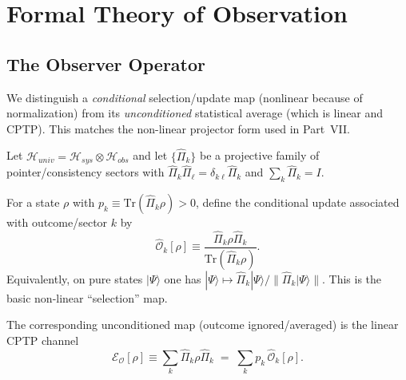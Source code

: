 \section{Formal Theory of Observation}
\label{app:formal_observation}

\subsection{The Observer Operator}
We distinguish a \emph{conditional} selection/update map (nonlinear because of normalization) from its \emph{unconditioned} statistical average (which is linear and CPTP). This matches the non-linear projector form used in Part~VII.\par
Let $\mathcal{H}_{univ} = \mathcal{H}_{sys} \otimes \mathcal{H}_{obs}$ and let $\{\hat{\Pi}_k\}$ be a projective family of pointer/consistency sectors with $\hat{\Pi}_k\hat{\Pi}_\ell=\delta_{k\ell}\hat{\Pi}_k$ and $\sum_k \hat{\Pi}_k = I$.

\begin{definition}
For a state $\rho$ with $p_k\equiv \mathrm{Tr}(\hat{\Pi}_k\rho)>0$, define the conditional update associated with outcome/sector $k$ by
\begin{equation}
    \hat{\mathcal{O}}_k[\rho] \equiv \frac{\hat{\Pi}_k \rho \hat{\Pi}_k}{\mathrm{Tr}(\hat{\Pi}_k\rho)}.
\end{equation}
Equivalently, on pure states $|\Psi\rangle$ one has $|\Psi\rangle \mapsto \hat{\Pi}_k|\Psi\rangle/\|\hat{\Pi}_k|\Psi\rangle\|$. This is the basic non-linear ``selection'' map.
\end{definition}

\begin{definition}
The corresponding unconditioned map (outcome ignored/averaged) is the linear CPTP channel
\begin{equation}
    \mathcal{E}_{\mathcal{O}}[\rho] \equiv \sum_k \hat{\Pi}_k \rho \hat{\Pi}_k
    \;=\;\sum_k p_k\,\hat{\mathcal{O}}_k[\rho].
\end{equation}
\end{definition}

